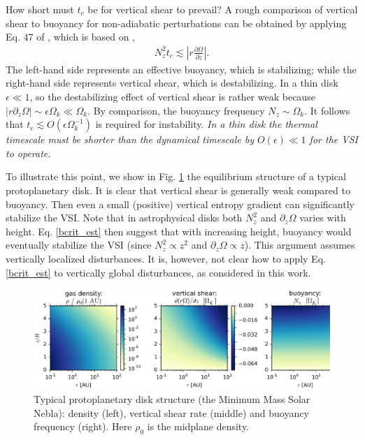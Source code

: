 \documentclass[iop]{emulateapj}
\newcommand{\p}{\partial}
\begin{document}
How short must $t_c$ be for vertical shear to prevail? A rough 
comparison of vertical shear to buoyancy for non-adiabatic
perturbations can be obtained by applying Eq. 47 of \cite{urpin03}, which is based on 
\cite{townsend58},   
\begin{align}\label{bcrit_est}
  N_z^2 t_c \lesssim \left|r\frac{\p\Omega}{\p z}\right|. 
\end{align}
The left-hand side represents an effective buoyancy, which is
stabilizing; while the right-hand side represents vertical shear,
which is destabilizing. In a thin disk $\epsilon \ll 1$, so the destabilizing effect of 
vertical shear is rather weak because $|r\p_z\Omega|\sim\epsilon\Omega_k
\ll \Omega_k$. By comparison, the buoyancy frequency $N_z\sim
\Omega_k$. It follows that $t_c\lesssim O(\epsilon\Omega_k^{-1})$ is
required for instability.  \emph{In a thin  
  disk the thermal timescale must be shorter than the dynamical
  timescale by $O(\epsilon)\ll 1$ for the VSI to operate.}   


To illustrate this point, we show in Fig. \ref{eqm_structure} the
equilibrium structure of a typical protoplanetary disk. %
It is
clear that vertical shear is 
generally weak compared to buoyancy. Then even a small (positive)
vertical entropy gradient can significantly stabilize the VSI. 
Note that in astrophysical disks both $N_z^2$ and $\p_z\Omega$ varies
with height. Eq. \ref{bcrit_est} then suggest that with
increasing height, buoyancy would eventually stabilize the VSI (since
$N_z^2\propto z^2$ and $\p_z\Omega\propto z$).
This argument assumes vertically localized disturbances. It is,
however, not clear how to apply Eq. \ref{bcrit_est} to vertically
global disturbances, as considered in this work.

\begin{figure}
  \includegraphics[width=\linewidth]{figures/rhoshearNz}
  \caption{Typical protoplanetary disk structure (the Minimum Mass
    Solar Nebla): density (left), vertical shear rate (middle) and
    buoyancy frequency (right). Here $\rho_0$ is the midplane density.  
    \label{eqm_structure} 
  }
\end{figure}
\end{document}
